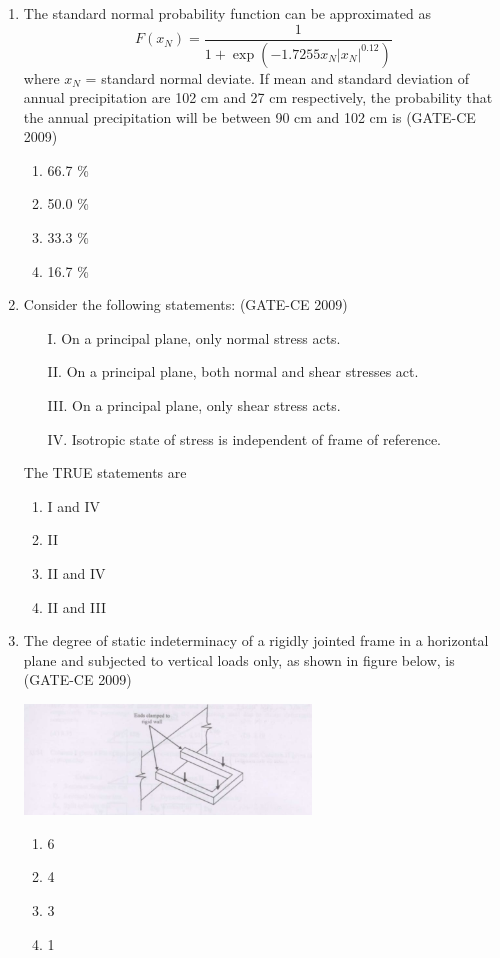 \documentclass[12pt]{article}
\begin{document}
\begin{enumerate}[label=Q.\arabic*]
    \item The standard normal probability function can be approximated as
    \[ F(x_N) = \frac{1}{1+\exp\left(-1.7255 x_N | x_N |^{0.12}\right)} \]
    where $x_N$ = standard normal deviate. If mean and standard deviation of annual precipitation are 102 cm and 27 cm respectively, the probability that the annual precipitation will be between 90 cm and 102 cm is (GATE-CE 2009)
    \begin{enumerate}[label=(\Alph*)]
        \item 66.7 \% 
        \item 50.0 \% 
        \item 33.3 \% 
        \item 16.7 \%
    \end{enumerate}
    
    \item Consider the following statements: (GATE-CE 2009)
    \begin{itemize}
        \item[I.] On a principal plane, only normal stress acts.
        \item[II.] On a principal plane, both normal and shear stresses act.
        \item[III.] On a principal plane, only shear stress acts.
        \item[IV.] Isotropic state of stress is independent of frame of reference.
    \end{itemize}
    The TRUE statements are
    \begin{enumerate}[label=(\Alph*)]
        \item I and IV 
        \item II 
        \item II and IV 
        \item II and III
    \end{enumerate}
    
    \item The degree of static indeterminacy of a rigidly jointed frame in a horizontal plane and subjected to vertical loads only, as shown in figure below, is (GATE-CE 2009)
    \begin{center}
    \includegraphics[width=0.6\textwidth]{image.jpg}
    \end{center}
    \begin{enumerate}[label=(\Alph*)]
        \item 6 
        \item 4 
        \item 3 
        \item 1
    \end{enumerate}
    

\end{enumerate}
\end{document}
